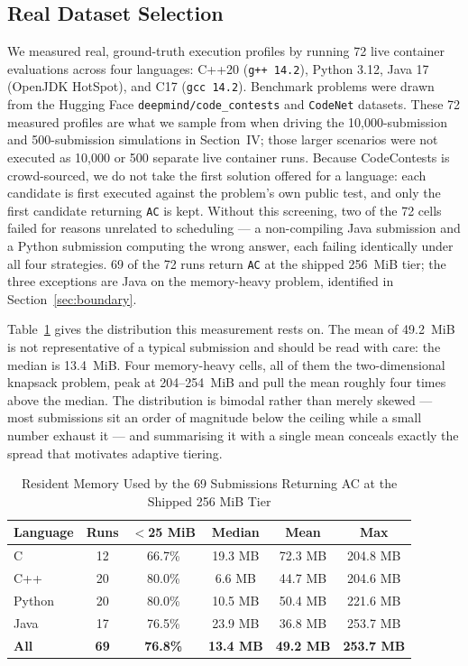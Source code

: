 \documentclass[conference]{IEEEtran}
\begin{document}
\subsection{Real Dataset Selection}
We measured real, ground-truth execution profiles by running 72 live container evaluations across four languages: C++20 (\texttt{g++ 14.2}), Python 3.12, Java 17 (OpenJDK HotSpot), and C17 (\texttt{gcc 14.2}). Benchmark problems were drawn from the Hugging Face \texttt{deepmind/code\_contests} \cite{li2022alphacode} and \texttt{CodeNet} \cite{puri2021codenet} datasets. These 72 measured profiles are what we sample from when driving the 10,000-submission and 500-submission simulations in Section~IV; those larger scenarios were not executed as 10,000 or 500 separate live container runs. Because CodeContests is crowd-sourced, we do not take the first solution offered for a language: each candidate is first executed against the problem's own public test, and only the first candidate returning \texttt{AC} is kept. Without this screening, two of the 72 cells failed for reasons unrelated to scheduling --- a non-compiling Java submission and a Python submission computing the wrong answer, each failing identically under all four strategies. 69 of the 72 runs return \texttt{AC} at the shipped 256~MiB tier; the three exceptions are Java on the memory-heavy problem, identified in Section~\ref{sec:boundary}.

Table~\ref{tab:mem_dist} gives the distribution this measurement rests on. The mean of 49.2~MiB is not representative of a typical submission and should be read with care: the median is 13.4~MiB. Four memory-heavy cells, all of them the two-dimensional knapsack problem, peak at 204--254~MiB and pull the mean roughly four times above the median. The distribution is bimodal rather than merely skewed --- most submissions sit an order of magnitude below the ceiling while a small number exhaust it --- and summarising it with a single mean conceals exactly the spread that motivates adaptive tiering.

\begin{table}[!t]
\caption{Resident Memory Used by the 69 Submissions Returning AC at the Shipped 256 MiB Tier}
\label{tab:mem_dist}
\centering
\small
\begin{tabular}{|l|c|c|c|c|c|}
\hline
\textbf{Language} & \textbf{Runs} & \textbf{$<$25 MiB} & \textbf{Median} & \textbf{Mean} & \textbf{Max} \\
\hline
C & 12 & 66.7\% & 19.3 MB & 72.3 MB & 204.8 MB \\
\hline
C++ & 20 & 80.0\% & 6.6 MB & 44.7 MB & 204.6 MB \\
\hline
Python & 20 & 80.0\% & 10.5 MB & 50.4 MB & 221.6 MB \\
\hline
Java & 17 & 76.5\% & 23.9 MB & 36.8 MB & 253.7 MB \\
\hline
\textbf{All} & \textbf{69} & \textbf{76.8\%} & \textbf{13.4 MB} & \textbf{49.2 MB} & \textbf{253.7 MB} \\
\hline
\end{tabular}
\end{table}
\end{document}
